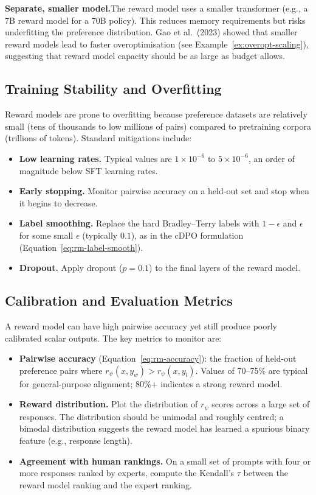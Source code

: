 \textbf{Separate, smaller model.}\quad The reward model uses a smaller transformer (e.g., a 7B reward model for a 70B policy). This reduces memory requirements but risks underfitting the preference distribution. Gao et al.\ (2023) showed that smaller reward models lead to faster overoptimisation (see Example~\ref{ex:overopt-scaling}), suggesting that reward model capacity should be as large as budget allows.

\subsection{Training Stability and Overfitting}
\label{sec:rm-overfitting}

Reward models are prone to overfitting because preference datasets are relatively small (tens of thousands to low millions of pairs) compared to pretraining corpora (trillions of tokens). Standard mitigations include:
\begin{itemize}[leftmargin=*]
  \item \textbf{Low learning rates.} Typical values are $1 \times 10^{-6}$ to $5 \times 10^{-6}$, an order of magnitude below SFT learning rates.
  \item \textbf{Early stopping.} Monitor pairwise accuracy on a held-out set and stop when it begins to decrease.
  \item \textbf{Label smoothing.} Replace the hard Bradley--Terry labels with $1 - \epsilon$ and $\epsilon$ for some small $\epsilon$ (typically $0.1$), as in the cDPO formulation (Equation~\eqref{eq:rm-label-smooth}).
  \item \textbf{Dropout.} Apply dropout ($p = 0.1$) to the final layers of the reward model.
\end{itemize}

\subsection{Calibration and Evaluation Metrics}
\label{sec:rm-eval}

A reward model can have high pairwise accuracy yet still produce poorly calibrated scalar outputs. The key metrics to monitor are:
\begin{itemize}[leftmargin=*]
  \item \textbf{Pairwise accuracy} (Equation~\eqref{eq:rm-accuracy}): the fraction of held-out preference pairs where $r_\psi(x, y_w) > r_\psi(x, y_l)$. Values of 70--75\% are typical for general-purpose alignment; 80\%+ indicates a strong reward model.
  \item \textbf{Reward distribution.} Plot the distribution of $r_\psi$ scores across a large set of responses. The distribution should be unimodal and roughly centred; a bimodal distribution suggests the reward model has learned a spurious binary feature (e.g., response length).
  \item \textbf{Agreement with human rankings.} On a small set of prompts with four or more responses ranked by experts, compute the Kendall's $\tau$ between the reward model ranking and the expert ranking.
\end{itemize}

